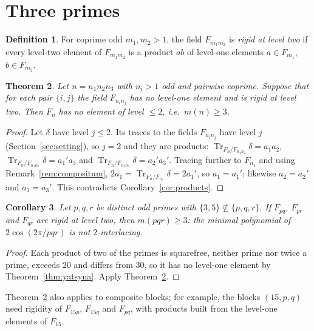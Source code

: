 \documentclass[11pt]{amsart}
\DeclareMathOperator{\Tr}{Tr}
\theoremstyle{plain}
\newtheorem{theorem}{Theorem}[section]
\newtheorem{corollary}[theorem]{Corollary}
\theoremstyle{definition}
\newtheorem{definition}[theorem]{Definition}
\begin{document}
\section{Three primes}\label{sec:three-primes}

\begin{definition}\label{def:rigid}
For coprime odd $m_1, m_2 > 1$, the field $F_{m_1m_2}$ is \emph{rigid at level two} if every
level-two element of $F_{m_1m_2}$ is a product $ab$ of level-one elements $a \in F_{m_1}$,
$b \in F_{m_2}$.
\end{definition}

\begin{theorem}\label{thm:three}
Let $n = n_1n_2n_3$ with $n_i > 1$ odd and pairwise coprime. Suppose that for each pair
$\{i,j\}$ the field $F_{n_in_j}$ has no level-one element and is rigid at level two. Then $F_n$
has no element of level $\leq 2$, i.e.\ $m(n) \geq 3$.
\end{theorem}

\begin{proof}
Let $\delta$ have level $j \leq 2$. Its traces to the fields $F_{n_in_j}$ have level $j$
(Section~\ref{sec:setting}), so $j = 2$ and they are products:
$\Tr_{F_n/F_{n_1n_2}}\delta = a_1a_2$, $\Tr_{F_n/F_{n_1n_3}}\delta = a_1'a_3$ and
$\Tr_{F_n/F_{n_2n_3}}\delta = a_2'a_3'$. Tracing further to $F_{n_1}$ and using
Remark~\ref{rem:compositum}, $2a_1 = \Tr_{F_n/F_{n_1}}\delta = 2a_1'$, so $a_1 = a_1'$; likewise
$a_2 = a_2'$ and $a_3 = a_3'$. This contradicts Corollary~\ref{cor:products}.
\end{proof}

\begin{corollary}\label{cor:primes}
Let $p, q, r$ be distinct odd primes with $\{3,5\} \not\subseteq \{p,q,r\}$. If $F_{pq}$, $F_{pr}$
and $F_{qr}$ are rigid at level two, then $m(pqr) \geq 3$: the minimal polynomial of
$2\cos(2\pi/pqr)$ is not $2$-interlacing.
\end{corollary}

\begin{proof}
Each product of two of the primes is squarefree, neither prime nor twice a prime, exceeds $20$
and differs from $30$, so it has no level-one element by Theorem~\ref{thm:yatsyna}. Apply
Theorem~\ref{thm:three}.
\end{proof}

Theorem~\ref{thm:three} also applies to composite blocks; for example, the blocks
$(15, p, q)$ need rigidity of $F_{15p}$, $F_{15q}$ and $F_{pq}$, with products built from the
level-one elements of $F_{15}$.
\end{document}
